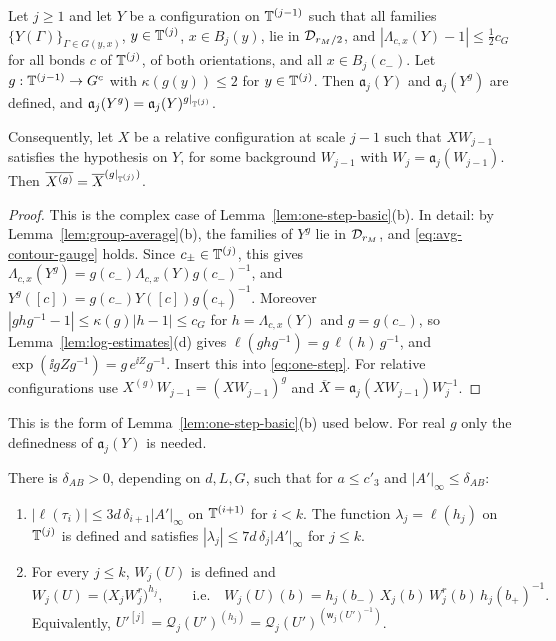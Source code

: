\begin{lemma}\label{lem:AB-cov}
Let $j\ge1$ and let $Y$ be a configuration on $\mathbb T^{(j-1)}$ such that all families $\{Y(\Gamma)\}_{\Gamma\in G(y,x)}$, $y\in\mathbb T^{(j)}$, $x\in B_j(y)$, lie in $\mathcal D_{r_M/2}$, and $|\Lambda_{c,x}(Y)-1|\le\frac12c_G$ for all bonds $c$ of $\mathbb T^{(j)}$, of both orientations, and all $x\in B_j(c_-)$. Let $g:\mathbb T^{(j-1)}\to G^c$ with $\kappa(g(y))\le2$ for $y\in\mathbb T^{(j)}$. Then $\mathfrak a_j(Y)$ and $\mathfrak a_j(Y^g)$ are defined, and $\mathfrak a_j(Y^g)=\mathfrak a_j(Y)^{g|_{\mathbb T^{(j)}}}$.

Consequently, let $X$ be a relative configuration at scale $j-1$ such that $XW_{j-1}$ satisfies the hypothesis on $Y$, for some background $W_{j-1}$ with $W_j=\mathfrak a_j(W_{j-1})$. Then $\overline{X^{(g)}}=\overline X^{(g|_{\mathbb T^{(j)}})}$.
\end{lemma}

\begin{proof}
This is the complex case of Lemma~\ref{lem:one-step-basic}(b). In detail: by Lemma~\ref{lem:group-average}(b), the families of $Y^g$ lie in $\mathcal D_{r_M}$, and \eqref{eq:avg-contour-gauge} holds. Since $c_\pm\in\mathbb T^{(j)}$, this gives $\Lambda_{c,x}(Y^g)=g(c_-)\Lambda_{c,x}(Y)g(c_-)^{-1}$, and $Y^g([c])=g(c_-)Y([c])g(c_+)^{-1}$. Moreover $|ghg^{-1}-1|\le\kappa(g)|h-1|\le c_G$ for $h=\Lambda_{c,x}(Y)$ and $g=g(c_-)$, so Lemma~\ref{lem:log-estimates}(d) gives $\ell(ghg^{-1})=g\,\ell(h)\,g^{-1}$, and $\exp(\ii gZg^{-1})=g\,e^{\ii Z}g^{-1}$. Insert this into \eqref{eq:one-step}. For relative configurations use $X^{(g)}W_{j-1}=(XW_{j-1})^g$ and $\overline X=\mathfrak a_j(XW_{j-1})W_j^{-1}$.
\end{proof}

This is the form of Lemma~\ref{lem:one-step-basic}(b) used below. For real $g$ only the definedness of $\mathfrak a_j(Y)$ is needed.

\begin{lemma}\label{lem:AB-rep}
There is $\delta_{AB}>0$, depending on $d,L,G$, such that for $a\le c'_3$ and $|A'|_\infty\le\delta_{AB}$:
\begin{enumerate}[label=(\alph*)]
\item $|\ell(\tau_i)|\le3d\,\delta_{i+1}|A'|_\infty$ on $\mathbb T^{(i+1)}$ for $i<k$. The function $\lambda_j=\ell(h_j)$ on $\mathbb T^{(j)}$ is defined and satisfies $|\lambda_j|\le7d\,\delta_j|A'|_\infty$ for $j\le k$.
\item For every $j\le k$, $W_j(U)$ is defined and
\begin{equation}\label{eq:AB-rep}
W_j(U)=\big(X_jW^r_j\big)^{h_j},\qquad\text{i.e.}\quad W_j(U)(b)=h_j(b_-)\,X_j(b)\,W^r_j(b)\,h_j(b_+)^{-1}.
\end{equation}
Equivalently, $U'^{[j]}=\mathcal Q_j(U')^{(h_j)}=\mathcal Q_j(U')^{(\mathsf w_j(U')^{-1})}$.
\end{enumerate}
\end{lemma}

